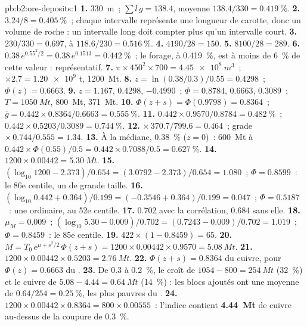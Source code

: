 \begin{solution}{pb:b2:ore-deposits:1}
\textbf{1.} \qty{330}{m}~; $\sum l\,g = 138.4$, moyenne $138.4/330 = \qty{0.419}{\percent}$.
\textbf{2.} $3.24/8 = \qty{0.405}{\percent}$~; chaque intervalle représente une longueur de carotte, donc un
volume de roche : un intervalle long doit compter plus qu'un intervalle court.
\textbf{3.} $230/330 = 0.697$, à $118.6/230 = \qty{0.516}{\percent}$.
\textbf{4.} $4190/28 = 150$.
\textbf{5.} $8100/28 = 289$.
\textbf{6.} $0.38\,e^{0.55^2/2} = 0.38\,e^{0.1513} = \qty{0.442}{\percent}$~; le forage, à
\qty{0.419}{\percent}, est à moins de \qty{6}{\percent} de cette valeur : représentatif.
\textbf{7.} $\pi \times 450^2 \times 700 = \qty{4.45e8}{m^3}$~; $\times 2.7 = \num{1.20e9}$ t,
\qty{1200}{Mt}.
\textbf{8.} $z = \ln(0.38/0.3)/0.55 = 0.4298$~; $\Phi(z) = 0.6663$.
\textbf{9.} $z = 1.167$, 0.4298, $-0.4990$~; $\Phi = 0.8784$, 0.6663, 0.3089~; $T = \qty{1050}{Mt}$,
\qty{800}{Mt}, \qty{371}{Mt}.
\textbf{10.} $\Phi(z + s) = \Phi(0.9798) = 0.8364$~; $\bar g = 0.442 \times 0.8364/0.6663 =
\qty{0.555}{\percent}$.
\textbf{11.} $0.442 \times 0.9570/0.8784 = \qty{0.482}{\percent}$~; $0.442 \times 0.5203/0.3089 =
\qty{0.744}{\percent}$.
\textbf{12.}  $\times\, 370.7/799.6 = 0.464$~; grade $\times\, 0.744/0.555 = 1.34$.
\textbf{13.} À la médiane, \qty{0.38}{\percent} ($z = 0$)~: \qty{600}{Mt} à $0.442 \times
\Phi(0.55)/0.5 = 0.442 \times 0.7088/0.5 = \qty{0.627}{\percent}$.
\textbf{14.} $1200 \times 0.00442 = \qty{5.30}{Mt}$.
\textbf{15.} $(\log_{10} 1200 - 2.373)/0.654 = (3.0792 - 2.373)/0.654 = 1.080$~; $\Phi = 0.8599$~: le
86e centile, un  de grande taille.
\textbf{16.} $(\log_{10} 0.442 + 0.364)/0.199 = (-0.3546 + 0.364)/0.199 = 0.047$~; $\Phi = 0.5187$~: une
 ordinaire, au 52e centile.
\textbf{17.} 0.702 avec la corrélation, 0.684 sans elle.
\textbf{18.} $\mu_M = 0.009$~; $(\log_{10} 5.30 - 0.009)/0.702 = (0.7243 - 0.009)/0.702 = 1.019$~; $\Phi =
0.8459$~: le 85e centile.
\textbf{19.} $422 \times (1 - 0.8459) = 65$.
\textbf{20.} $M = T_0\,e^{\mu + s^2/2}\,\Phi(z + s) = 1200 \times 0.00442 \times 0.9570 =
\qty{5.08}{Mt}$.
\textbf{21.} $1200 \times 0.00442 \times 0.5203 = \qty{2.76}{Mt}$.
\textbf{22.} $\Phi(z + s) = 0.8364$ du cuivre, pour $\Phi(z) = 0.6663$ du .
\textbf{23.} De 0.3 à \qty{0.2}{\percent}, le  croît de $1054 - 800 = \qty{254}{Mt}$
(\qty{32}{\percent}) et le cuivre de $5.08 - 4.44 = \qty{0.64}{Mt}$ (\qty{14}{\percent}) : les blocs ajoutés
ont une moyenne de $0.64/254 = \qty{0.25}{\percent}$, les plus pauvres du .
\textbf{24.} $1200 \times 0.00442 \times 0.8364 = 800 \times 0.00555$~: l'indice contient
\textbf{\qty[text-series-to-math=true]{4.44}{Mt}} de cuivre au-dessus de la coupure de \qty{0.3}{\percent}.
\end{solution}
